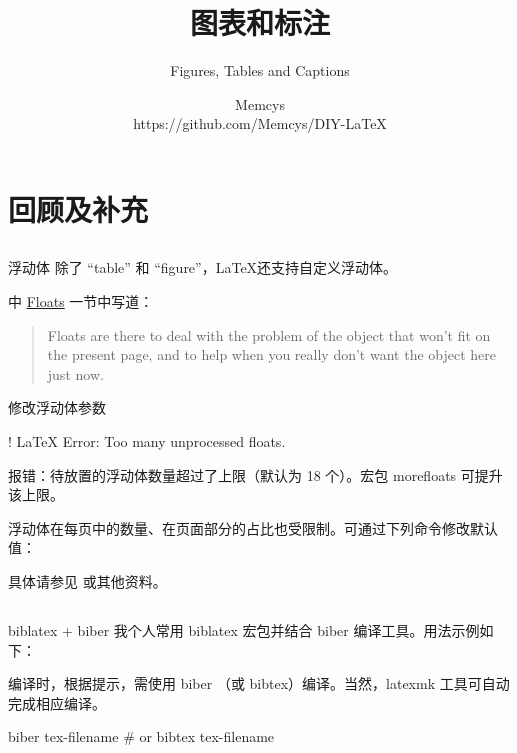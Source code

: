 \documentclass[]{ctexbeamer}
\title{图表和标注}
\subtitle{Figures, Tables and Captions}
\author[Memcys]{Memcys \\ https://github.com/Memcys/DIY-LaTeX}
\institute[UCAS]{University of Chinese Academy of Sciences}
\begin{document}
\titlepage

\setcounter{section}{-1}
\section{回顾及补充}
% 

\subsection{}
\begin{frame}{浮动体}
除了 ``table'' 和 ``figure''，\LaTeX 还支持自定义浮动体。

\cite{wiki:floats} 中 \href{https://en.wikibooks.org/wiki/LaTeX/Floats,\_Figures\_and\_Captions\#Floats}{Floats} 一节中写道：
\begin{quote}
  Floats are there to deal with the problem of the object that won't fit on the present page, and to help when you really don't want the object here just now. 
\end{quote}
\end{frame}

\begin{frame}[fragile]{修改浮动体参数}
\begin{bashlst}
! LaTeX Error: Too many unprocessed floats.
\end{bashlst}
报错：待放置的浮动体数量超过了上限（默认为 18 个）。宏包 morefloats 可提升该上限。

浮动体在每页中的数量、在页面部分的占比也受限制。可通过下列命令修改默认值：
\begin{texlst}
\setcounter{topnumber}{2}
\setcounter{bottomnumber}{2}
\setcounter{totalnumber}{4}
\renewcommand{\topfraction}{0.85}
\renewcommand{\bottomfraction}{0.85}
\renewcommand{\textfraction}{0.15}
\renewcommand{\floatpagefraction}{0.7}
\end{texlst}
具体请参见 \cite{placement} 或其他资料。
\end{frame}


\subsection{}
\begin{frame}[fragile]{biblatex + biber}
我个人常用 biblatex 宏包并结合 biber 编译工具。用法示例如下：
\begin{texlst}
\usepackage[]{biblatex}


\printbibliography[]
\end{texlst}
编译时，根据提示，需使用 biber （或 bibtex）编译。当然，latexmk 工具可自动完成相应编译。
\begin{bashlst}
biber tex-filename
# or bibtex tex-filename
\end{bashlst}
\end{frame}
\end{document}
